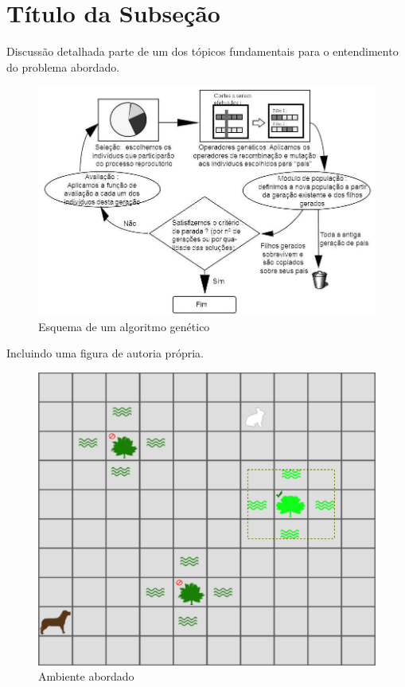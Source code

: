 \section{Título da Subseção} \label{sec:definir-outro-tituto-de-secao}
Discussão detalhada parte de um dos tópicos fundamentais para o entendimento do problema abordado.
\begin{figure} [htb]
    \begin{center}
	 \caption{\label{fig:ag}Esquema de um algoritmo genético}
        \includegraphics[scale=0.6]{imagens/nome-cap/nome-sec/esquemaAlgGenetico_pag64.png}
    	\end{center}
    \end{figure}
    
Incluindo uma figura de autoria própria.
\begin{figure} [htb]
\begin{center}
	 \caption{\label{fig:ambiente}Ambiente abordado}
	    \includegraphics[scale=0.3]{imagens/nome-cap/nome-sec/ambiente.eps}
    \end{center}
\end{figure}



